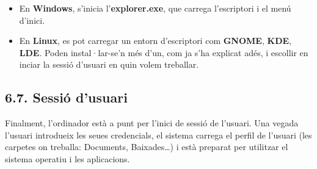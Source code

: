 \documentclass[
  a4paper,
]{article}
\begin{document}
\begin{itemize}
\item
  En \textbf{Windows}, s'inicia l'\textbf{explorer.exe}, que carrega
  l'escriptori i el menú d'inici.
\item
  En \textbf{Linux}, es pot carregar un entorn d'escriptori com
  \textbf{GNOME}, \textbf{KDE}, \textbf{LDE}. Poden instal·lar-se'n més
  d'un, com ja s'ha explicat adés, i escollir en inciar la sessió
  d'usuari en quin volem treballar.
\end{itemize}

\subsection{\texorpdfstring{6.7. \textbf{Sessió
d'usuari}}{6.7. Sessió d'usuari}}\label{sessiuxf3-dusuari}

Finalment, l'ordinador està a punt per l'inici de sessió de l'usuari.
Una vegada l'usuari introdueix les seues credencials, el sistema carrega
el perfil de l'usuari (les carpetes on treballa: Documents,
Baixades\ldots) i està preparat per utilitzar el sistema operatiu i les
aplicacions.
\end{document}
